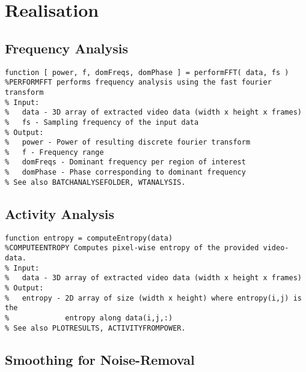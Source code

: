 \documentclass[11pt]{scrartcl}
\begin{document}

\section{Realisation} 

\subsection{Frequency Analysis}

\begin{minipage}{\linewidth}
  \begin{lstlisting}[caption={Function performing the frequency analysis using the FFT.}, label=list:res]
function [ power, f, domFreqs, domPhase ] = performFFT( data, fs )
%PERFORMFFT performs frequency analysis using the fast fourier transform
% Input:
%   data - 3D array of extracted video data (width x height x frames)
%   fs - Sampling frequency of the input data
% Output:
%   power - Power of resulting discrete fourier transform
%   f - Frequency range
%   domFreqs - Dominant frequency per region of interest 
%   domPhase - Phase corresponding to dominant frequency
% See also BATCHANALYSEFOLDER, WTANALYSIS.
  \end{lstlisting}
\end{minipage}



\subsection{Activity Analysis}

\begin{minipage}{\linewidth}
  \begin{lstlisting}[caption={Function performing the activity analysis using entropy.}, label=list:res]
function entropy = computeEntropy(data) 
%COMPUTEENTROPY Computes pixel-wise entropy of the provided video-data.
% Input:
%   data - 3D array of extracted video data (width x height x frames)
% Output:
%   entropy - 2D array of size (width x height) where entropy(i,j) is the
%             entropy along data(i,j,:)
% See also PLOTRESULTS, ACTIVITYFROMPOWER.
  \end{lstlisting}
\end{minipage}

\subsection{Smoothing for Noise-Removal}
\end{document}

